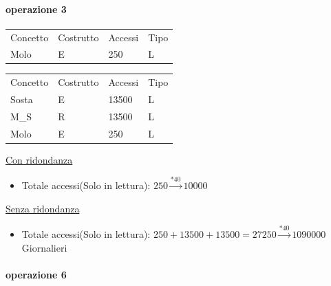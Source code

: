 \paragraph{operazione 3}

\begin{center}
    \begin{minipage}{.48\linewidth}
        \begin{tabularx}{\linewidth}{|X|l|l|l|}
            \hline
            \rowcolor{gray!30}
            \multicolumn{4}{|c|}{\textbf{Con ridondanza}}\\
            \hline
            \rowcolor{gray!15}
            Concetto & Costrutto & Accessi & Tipo\\
            \hline
            Molo & E & 250 & L\\
            \hline
        \end{tabularx}
    \end{minipage}
    \begin{minipage}{.48\linewidth}
        \begin{tabularx}{\linewidth}{|X|l|l|l|}
            \hline
            \rowcolor{gray!30}
            \multicolumn{4}{|c|}{\textbf{Senza ridondanza}}\\
            \hline
            \rowcolor{gray!15}
            Concetto & Costrutto & Accessi & Tipo\\
            \hline
            Sosta & E & 13500 & L\\
            \hline
            M\_S & R & 13500 & L\\
            \hline
            Molo & E & 250 & L\\
            \hline
        \end{tabularx}
    \end{minipage}
\end{center}

\underline{Con ridondanza}
\begin{itemize}
    \item Totale accessi(Solo in lettura): $250\xrightarrow{*40} 10000$
\end{itemize}

\underline{Senza ridondanza}
\begin{itemize}
    \item Totale accessi(Solo in lettura): $250+13500+13500 = 27250 \xrightarrow{*40} 1090000$ Giornalieri
\end{itemize}

\paragraph{operazione 6}

